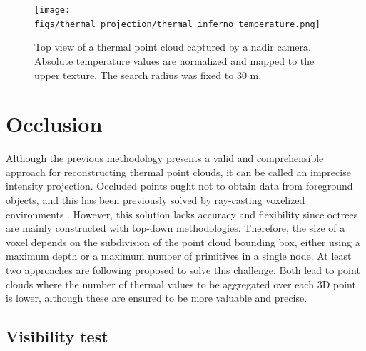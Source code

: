 \begin{figure}[ht]
	\centering
	\texttt{[image: figs/thermal\_projection/thermal\_inferno\_temperature.png]}
	\caption{Top view of a thermal point cloud captured by a nadir camera. Absolute temperature values are normalized and mapped to the upper texture. The search radius was fixed to 30 \si{\meter}.}
	\label{fig:thermal_point_cloud_top_view}
\end{figure}

\section{Occlusion}

Although the previous methodology presents a valid and comprehensible approach for reconstructing thermal point clouds, it can be called an imprecise intensity projection. Occluded points ought not to obtain data from foreground objects, and this has been previously solved by ray-casting voxelized environments \cite{vidas_real-time_2015}. However, this solution lacks accuracy and flexibility since octrees are mainly constructed with top-down methodologies. Therefore, the size of a voxel depends on the subdivision of the point cloud bounding box, either using a maximum depth or a maximum number of primitives in a single node. At least two approaches are following proposed to solve this challenge. Both lead to point clouds where the number of thermal values to be aggregated over each 3D point is lower, although these are ensured to be more valuable and precise.

\subsection{Visibility test}

